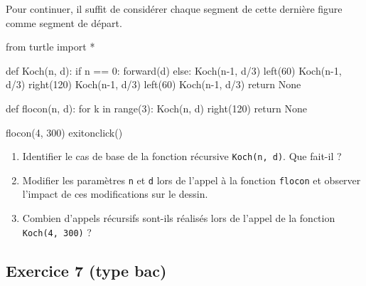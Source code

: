 \documentclass[
  a4paper,
  DIV=11,
  numbers=noendperiod]{scrartcl}
\newenvironment{Shaded}{\begin{snugshade}}{\end{snugshade}}
\newcommand{\BuiltInTok}[1]{\textcolor[rgb]{0.00,0.23,0.31}{#1}}
\newcommand{\ControlFlowTok}[1]{\textcolor[rgb]{0.00,0.23,0.31}{#1}}
\newcommand{\DecValTok}[1]{\textcolor[rgb]{0.68,0.00,0.00}{#1}}
\newcommand{\ImportTok}[1]{\textcolor[rgb]{0.00,0.46,0.62}{#1}}
\newcommand{\KeywordTok}[1]{\textcolor[rgb]{0.00,0.23,0.31}{#1}}
\newcommand{\NormalTok}[1]{\textcolor[rgb]{0.00,0.23,0.31}{#1}}
\newcommand{\OperatorTok}[1]{\textcolor[rgb]{0.37,0.37,0.37}{#1}}
\newcommand{\VariableTok}[1]{\textcolor[rgb]{0.07,0.07,0.07}{#1}}
\providecommand{\tightlist}{%
  \setlength{\itemsep}{0pt}\setlength{\parskip}{0pt}}\usepackage{longtable,booktabs,array}
\begin{document}
Pour continuer, il suffit de considérer chaque segment de cette dernière
figure comme segment de départ.

\begin{Shaded}
\begin{Highlighting}[]
\ImportTok{from}\NormalTok{ turtle }\ImportTok{import} \OperatorTok{*}


\KeywordTok{def}\NormalTok{ Koch(n, d):}
    \ControlFlowTok{if}\NormalTok{ n }\OperatorTok{==} \DecValTok{0}\NormalTok{:}
\NormalTok{        forward(d)}
    \ControlFlowTok{else}\NormalTok{:}
\NormalTok{        Koch(n}\OperatorTok{{-}}\DecValTok{1}\NormalTok{, d}\OperatorTok{/}\DecValTok{3}\NormalTok{)}
\NormalTok{        left(}\DecValTok{60}\NormalTok{)}
\NormalTok{        Koch(n}\OperatorTok{{-}}\DecValTok{1}\NormalTok{, d}\OperatorTok{/}\DecValTok{3}\NormalTok{)}
\NormalTok{        right(}\DecValTok{120}\NormalTok{)}
\NormalTok{        Koch(n}\OperatorTok{{-}}\DecValTok{1}\NormalTok{, d}\OperatorTok{/}\DecValTok{3}\NormalTok{)}
\NormalTok{        left(}\DecValTok{60}\NormalTok{)}
\NormalTok{        Koch(n}\OperatorTok{{-}}\DecValTok{1}\NormalTok{, d}\OperatorTok{/}\DecValTok{3}\NormalTok{)}
    \ControlFlowTok{return} \VariableTok{None}


\KeywordTok{def}\NormalTok{ flocon(n, d):}
    \ControlFlowTok{for}\NormalTok{ k }\KeywordTok{in} \BuiltInTok{range}\NormalTok{(}\DecValTok{3}\NormalTok{):}
\NormalTok{        Koch(n, d)}
\NormalTok{        right(}\DecValTok{120}\NormalTok{)}
    \ControlFlowTok{return} \VariableTok{None}


\NormalTok{flocon(}\DecValTok{4}\NormalTok{, }\DecValTok{300}\NormalTok{)}
\NormalTok{exitonclick()}
\end{Highlighting}
\end{Shaded}

\begin{enumerate}
\def\labelenumi{\arabic{enumi}.}
\tightlist
\item
  Identifier le cas de base de la fonction récursive
  \texttt{Koch(n,\ d)}. Que fait-il ?
\item
  Modifier les paramètres \texttt{n} et \texttt{d} lors de l'appel à la
  fonction \texttt{flocon} et observer l'impact de ces modifications sur
  le dessin.
\item
  Combien d'appels récursifs sont-ils réalisés lors de l'appel de la
  fonction \texttt{Koch(4,\ 300)} ?
\end{enumerate}

\hypertarget{fa-solid-pencil-alt-exercice-7-type-bac}{%
\subsection{\texorpdfstring{ Exercice 7 (type
bac)}{ Exercice 7 (type bac)}}\label{fa-solid-pencil-alt-exercice-7-type-bac}}
\end{document}
